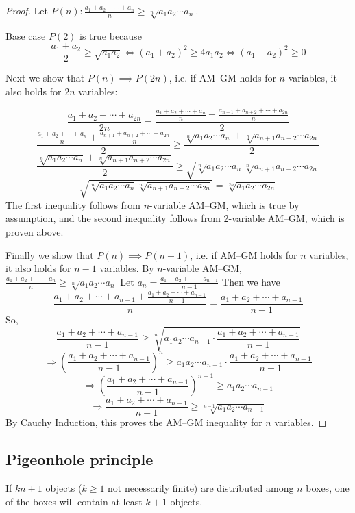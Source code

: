 \begin{proof}
Let $\displaystyle P(n):\frac{a_1+a_2+\cdots+a_n}{n}\ge\sqrt[n]{a_1a_2\cdots a_n}$.

Base case $P(2)$ is true because\[\frac{a_1+a_2}{2}\ge\sqrt{a_1a_2} \iff (a_1+a_2)^2\ge 4a_1a_2 \iff (a_1-a_2)^2\ge0\]

Next we show that $P(n)\implies P(2n)$, i.e. if AM--GM holds for $n$ variables, it also holds for $2n$ variables:

\[\frac{a_1+a_2+\cdots+a_{2n}}{2n}=\frac{\frac{a_1+a_2+\cdots+a_n}{n}+\frac{a_{n+1}+a_{n+2}+\cdots+a_{2n}}{n}}{2}\]\[\frac{\frac{a_1+a_2+\cdots+a_n}{n}+\frac{a_{n+1}+a_{n+2}+\cdots+a_{2n}}{n}}{2}\ge\frac{\sqrt[n]{a_1a_2\cdots a_n}+\sqrt[n]{a_{n+1}a_{n+2}\cdots a_{2n}}}{2}\]\[\frac{\sqrt[n]{a_1a_2\cdots a_n}+\sqrt[n]{a_{n+1}a_{n+2}\cdots a_{2n}}}{2}\ge\sqrt{\sqrt[n]{a_1a_2\cdots a_n}\sqrt[n]{a_{n+1}a_{n+2}\cdots a_{2n}}}\]\[\sqrt{\sqrt[n]{a_1a_2\cdots a_n}\sqrt[n]{a_{n+1}a_{n+2}\cdots a_{2n}}}=\sqrt[2n]{a_1a_2\cdots a_{2n}}\]
The first inequality follows from $n$-variable AM--GM, which is true by assumption, and the second inequality follows from 2-variable AM--GM, which is proven above.

Finally we show that $P(n)\implies P(n-1)$, i.e. if AM--GM holds for $n$ variables, it also holds for $n-1$ variables. By $n$-variable AM--GM, $\frac{a_1+a_2+\cdots+a_n}{n}\ge\sqrt[n]{a_1a_2\cdots a_n}$ Let $a_n=\frac{a_1+a_2+\cdots+a_{n-1}}{n-1}$ Then we have\[\frac{a_1+a_2+\cdots+a_{n-1}+\frac{a_1+a_2+\cdots+a_{n-1}}{n-1}}{n}=\frac{a_1+a_2+\cdots+a_{n-1}}{n-1}\]So,\[\frac{a_1+a_2+\cdots+a_{n-1}}{n-1}\ge\sqrt[n]{a_1a_2\cdots a_{n-1}\cdot \frac{a_1+a_2+\cdots+a_{n-1}}{n-1}}\]\[\Rightarrow\left(\frac{a_1+a_2+\cdots+a_{n-1}}{n-1}\right)^n\ge a_1a_2\cdots a_{n-1}\cdot \frac{a_1+a_2+\cdots+a_{n-1}}{n-1}\]\[\Rightarrow\left(\frac{a_1+a_2+\cdots+a_{n-1}}{n-1}\right)^{n-1}\ge a_1a_2\cdots a_{n-1}\]\[\Rightarrow \frac{a_1+a_2+\cdots+a_{n-1}}{n-1}\ge\sqrt[n-1]{a_1a_2\cdots a_{n-1}}\]
By Cauchy Induction, this proves the AM--GM inequality for $n$ variables.
\end{proof}

\subsection{Pigeonhole principle}
\begin{theorem}
If $kn+1$ objects ($k\ge1$ not necessarily finite) are distributed among $n$ boxes, one of the boxes will contain at least $k+1$ objects.
\end{theorem}

